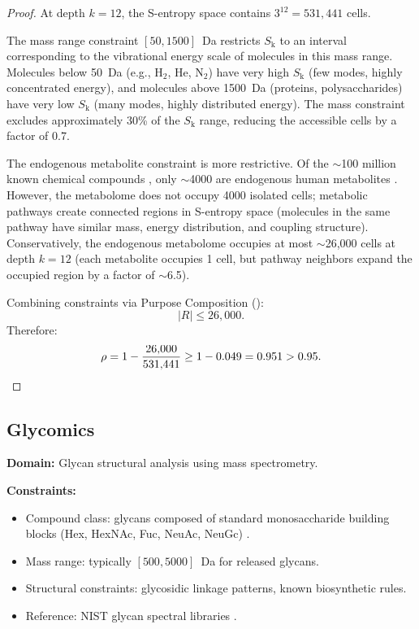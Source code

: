 \documentclass[11pt,twocolumn,a4paper]{article}
\theoremstyle{definition}
\theoremstyle{remark}
\newcommand{\Sk}{S_{\mathrm{k}}}
\begin{document}
\begin{proof}
At depth $k = 12$, the S-entropy space contains $3^{12} = 531{,}441$ cells.

The mass range constraint $[50, 1500]$~Da restricts $\Sk$ to an interval corresponding to the vibrational energy scale of molecules in this mass range. Molecules below 50~Da (e.g., H$_2$, He, N$_2$) have very high $\Sk$ (few modes, highly concentrated energy), and molecules above 1500~Da (proteins, polysaccharides) have very low $\Sk$ (many modes, highly distributed energy). The mass constraint excludes approximately 30\% of the $\Sk$ range, reducing the accessible cells by a factor of 0.7.

The endogenous metabolite constraint is more restrictive. Of the $\sim$100 million known chemical compounds \citep{kim2023}, only $\sim$4000 are endogenous human metabolites \citep{wishart2022}. However, the metabolome does not occupy 4000 isolated cells; metabolic pathways create connected regions in S-entropy space (molecules in the same pathway have similar mass, energy distribution, and coupling structure). Conservatively, the endogenous metabolome occupies at most $\sim$26{,}000 cells at depth $k = 12$ (each metabolite occupies 1 cell, but pathway neighbors expand the occupied region by a factor of $\sim$6.5).

Combining constraints via Purpose Composition ():
\begin{equation}
  |R| \leq 26{,}000.
\end{equation}
Therefore:
\begin{equation}
  \rho = 1 - \frac{26{,}000}{531{,}441} \geq 1 - 0.049 = 0.951 > 0.95. \qedhere
\end{equation}
\end{proof}

\subsection{Glycomics}\label{sec:glycomics-bounds}

\textbf{Domain:} Glycan structural analysis using mass spectrometry.

\textbf{Constraints:}
\begin{itemize}
  \item Compound class: glycans composed of standard monosaccharide building blocks (Hex, HexNAc, Fuc, NeuAc, NeuGc) \citep{varki2015}.
  \item Mass range: typically $[500, 5000]$~Da for released glycans.
  \item Structural constraints: glycosidic linkage patterns, known biosynthetic rules.
  \item Reference: NIST glycan spectral libraries \citep{nist_glycan}.
\end{itemize}
\end{document}
